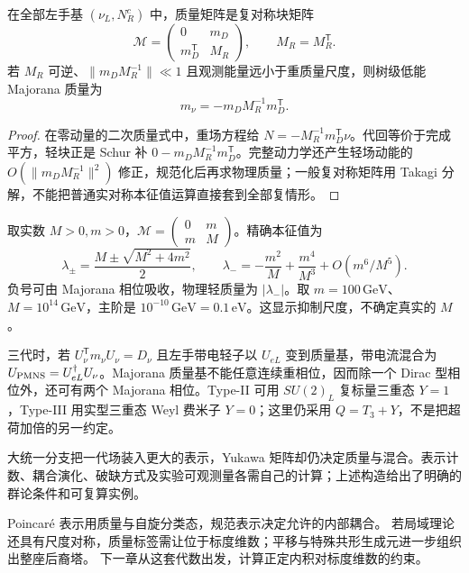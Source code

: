 \begin{proposition}
在全部左手基 $(\nu_L,N_R^c)$ 中，质量矩阵是复对称块矩阵
\begin{equation}
 \mathcal M=\begin{pmatrix}0&m_D\\m_D^{\mathsf T}&M_R\end{pmatrix},\qquad M_R=M_R^{\mathsf T}.
 \label{eq:seesaw-matrix}
\end{equation}
若 $M_R$ 可逆、$\|m_DM_R^{-1}\|\ll1$ 且观测能量远小于重质量尺度，则树级低能 Majorana 质量为
\begin{equation}
 m_\nu=-m_DM_R^{-1}m_D^{\mathsf T}.
 \label{eq:seesaw-formula}
\end{equation}
\end{proposition}
\begin{proof}
在零动量的二次质量式中，重场方程给 $N=-M_R^{-1}m_D^{\mathsf T}\nu$。代回等价于完成平方，轻块正是 Schur 补 $0-m_DM_R^{-1}m_D^{\mathsf T}$。完整动力学还产生轻场动能的 $O(\|m_DM_R^{-1}\|^2)$ 修正，规范化后再求物理质量；一般复对称矩阵用 Takagi 分解，不能把普通实对称本征值运算直接套到全部复情形。
\end{proof}

\begin{workedexample}[一代精确对角化与轻子混合]
取实数 $M>0,m>0$，$\mathcal M=\left(\begin{smallmatrix}0&m\\m&M\end{smallmatrix}\right)$。精确本征值为
\[
 \lambda_\pm=\frac{M\pm\sqrt{M^2+4m^2}}2,\qquad
 \lambda_-=-\frac{m^2}{M}+\frac{m^4}{M^3}+O(m^6/M^5).
\]
负号可由 Majorana 相位吸收，物理轻质量为 $|\lambda_-|$。取 $m=100\,\mathrm{GeV}$、$M=10^{14}\,\mathrm{GeV}$，主阶是 $10^{-10}\,\mathrm{GeV}=0.1\,\mathrm{eV}$。这显示抑制尺度，不确定真实的 $M$。

三代时，若 $U_\nu^{\mathsf T}m_\nu U_\nu=D_\nu$ 且左手带电轻子以 $U_{eL}$ 变到质量基，带电流混合为 $U_{\rm PMNS}=U_{eL}^\dagger U_\nu$。Majorana 质量基不能任意连续重相位，因而除一个 Dirac 型相位外，还可有两个 Majorana 相位。Type-II 可用 $SU(2)_L$ 复标量三重态 $Y=1$，Type-III 用实型三重态 Weyl 费米子 $Y=0$；这里仍采用 $Q=T_3+Y$，不是把超荷加倍的另一约定。
\end{workedexample}

大统一分支把一代场装入更大的表示，Yukawa 矩阵却仍决定质量与混合。表示计数、耦合演化、破缺方式及实验可观测量各需自己的计算；上述构造给出了明确的群论条件和可复算实例。


Poincar\'e 表示用质量与自旋分类态，规范表示决定允许的内部耦合。
若局域理论还具有尺度对称，质量标签需让位于标度维数；平移与特殊共形生成元进一步组织出整座后裔塔。
下一章从这套代数出发，计算正定内积对标度维数的约束。
